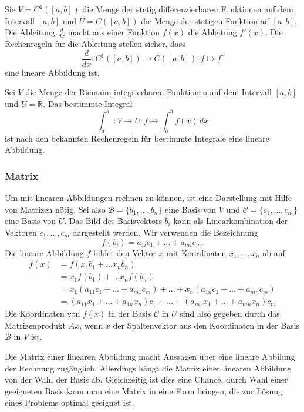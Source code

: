 \begin{beispiel}
Sie $V=C^1([a,b])$ die Menge der stetig differenzierbaren Funktionen 
auf dem Intervall $[a,b]$ und $U=C([a,b])$ die Menge der
stetigen Funktion aif $[a,b]$. 
Die Ableitung $\frac{d}{dx}$ macht aus einer Funktion $f(x)$ die
Ableitung $f'(x)$.
Die Rechenregeln für die Ableitung stellen sicher, dass 
\[
\frac{d}{dx}
\colon
C^1([a,b]) \to  C([a,b]) 
:
f \mapsto f'
\]
eine lineare Abbildung ist.
\end{beispiel}

\begin{beispiel}
Sei $V$ die Menge der Riemann-integrierbaren Funktionen auf dem
Intervall $[a,b]$ und $U=\mathbb{R}$.
Das bestimmte Integral
\[
\int_a^b \;\colon V \to U : f \mapsto \int_a^b f(x)\,dx
\]
ist nach den bekannten Rechenregeln für bestimmte Integrale
eine lineare Abbildung.
\end{beispiel}

\subsubsection{Matrix}
Um mit linearen Abbildungen rechnen zu können, ist eine Darstellung 
mit Hilfe von Matrizen nötig.
Sei also $\mathcal{B}=\{b_1,\dots,b_n\}$ eine Basis von $V$ und
$\mathcal{C} = \{ c_1,\dots,c_m\}$ eine Basis von $U$.
Das Bild des Basisvektors $b_i$ kann als Linearkombination der
Vektoren $c_1,\dots,c_m$ dargestellt werden.
Wir verwenden die Bezeichnung
\[
f(b_i) 
=
a_{1i} c_1 + \dots + a_{mi} c_m.
\]
Die lineare Abbildung $f$ bildet den Vektor $x$ mit Koordinaten
$x_1,\dots,x_n$ ab auf 
\begin{align*}
f(x)
&=
f(x_1b_1  + \dots x_nb_n)
\\
&=
x_1 f(b_1) + \dots x_nf(b_n)
\\
&=
x_1(a_{11} c_1 + \dots + a_{m1} c_m)
+
\dots
+
x_n(a_{1n} c_1 + \dots + a_{mn} c_m)
\\
&=
( a_{11} x_1 + \dots + a_{1n} x_n ) c_1
+
\dots
+
( a_{m1} x_1 + \dots + a_{mn} x_n ) c_m
\end{align*}
Die Koordinaten von $f(x)$ in der Basis $\mathcal{C}$ in $U$ sind 
also gegeben durch das Matrizenprodukt $Ax$, wenn $x$ der Spaltenvektor
aus den Koordinaten in der Basis $\mathcal{B}$ in $V$ ist.

Die Matrix einer linearen Abbildung macht Aussagen über eine lineare
Abbilung der Rechnung zugänglich.
Allerdings hängt die Matrix einer linearen Abbildung von der Wahl der
Basis ab.
Gleichzeitig ist dies eine Chance, durch Wahl einer geeigneten Basis
kann man eine Matrix in eine Form bringen, die zur Lösung eines
Problems optimal geeignet ist.

